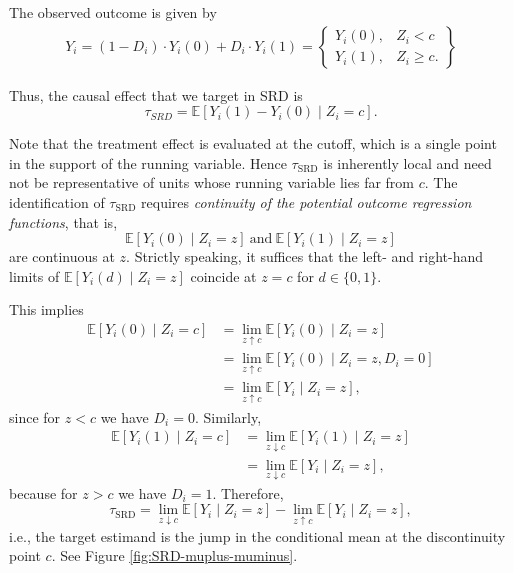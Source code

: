 The observed outcome is given by
\begin{align*}
	Y_i=(1-D_i)\cdot Y_i(0) + D_i\cdot Y_i(1)=\begin{Bmatrix}
		Y_i(0), & Z_i < c\\
		Y_i(1), & Z_i \geq c.
	\end{Bmatrix}
\end{align*}

Thus, the causal effect that we target in SRD is
\[
\tau_{SRD}=\mathbb{E}[Y_i(1)-Y_i(0)\mid Z_i=c].
\]

Note that the treatment effect is evaluated at the cutoff, which is a single point in the support of the running variable. Hence $\tau_{\text{SRD}}$ is inherently local and need not be representative of units whose running variable lies far from $c$.
The identification of $\tau_{\text{SRD}}$ requires \emph{continuity of the potential outcome regression functions}, that is,
\[
\mathbb{E}[Y_i(0)\mid Z_i=z]\ \text{and}\ \mathbb{E}[Y_i(1)\mid Z_i=z]
\]
are continuous at $z$. Strictly speaking, it suffices that the left- and right-hand limits of $\mathbb{E}[Y_i(d)\mid Z_i=z]$ coincide at $z=c$ for $d\in\{0,1\}$.

This implies
\begin{align*}
	\mathbb{E}[Y_i(0)\mid Z_i=c]
	&= \lim_{z \uparrow c}\mathbb{E}[Y_i(0)\mid Z_i=z] \\
	&= \lim_{z \uparrow c}\mathbb{E}[Y_i(0)\mid Z_i=z, D_i=0] \\
	&= \lim_{z \uparrow c}\mathbb{E}[Y_i\mid Z_i=z],
\end{align*}
since for $z<c$ we have $D_i=0$. Similarly,
\begin{align*}
	\mathbb{E}[Y_i(1)\mid Z_i=c]
	&= \lim_{z \downarrow c}\mathbb{E}[Y_i(1)\mid Z_i=z] \\
	&= \lim_{z \downarrow c}\mathbb{E}[Y_i\mid Z_i=z],
\end{align*}
because for $z>c$ we have $D_i=1$. Therefore,
\[
\tau_{\text{SRD}}
= \lim_{z \downarrow c}\mathbb{E}[Y_i\mid Z_i=z]
- \lim_{z \uparrow c}\mathbb{E}[Y_i\mid Z_i=z],
\]
i.e., the target estimand is the jump in the conditional mean at the discontinuity point $c$. See Figure \ref{fig:SRD-muplus-muminus}.

